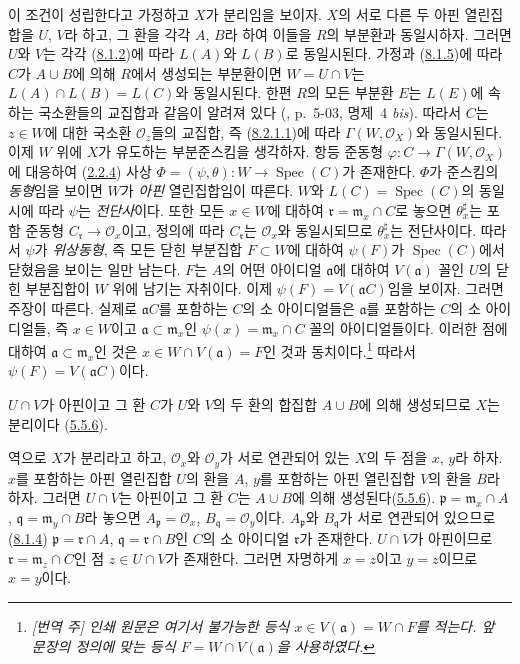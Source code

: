 이 조건이 성립한다고 가정하고 $X$가 분리임을 보이자. $X$의 서로 다른
두 아핀 열린집합을 $U$, $V$라 하고, 그 환을 각각 $A$, $B$라 하여
이들을 $R$의 부분환과 동일시하자. 그러면 $U$와 $V$는 각각
(\hyperref[I.8.1.2-ko]{8.1.2})에 따라 $L(A)$와 $L(B)$로 동일시된다.
가정과 (\hyperref[I.8.1.5-ko]{8.1.5})에 따라 $C$가 $A\cup B$에 의해
$R$에서 생성되는 부분환이면 $W=U\cap V$는
$L(A)\cap L(B)=L(C)$와 동일시된다. 한편 $R$의 모든 부분환 $E$는
$L(E)$에 속하는 국소환들의 교집합과 같음이 알려져 있다
(\cite{I-1}, p.~5-03, 명제~4 \emph{bis}). 따라서 $C$는 $z\in W$에
대한 국소환 $\mathscr{O}_z$들의 교집합, 즉
(\hyperref[I.8.2.1.1-ko]{8.2.1.1})에 따라
$\Gamma(W,\mathscr{O}_X)$와 동일시된다. 이제 $W$ 위에 $X$가 유도하는
부분준스킴을 생각하자. 항등 준동형
$\varphi:C\to\Gamma(W,\mathscr{O}_X)$에 대응하여
(\hyperref[I.2.2.4-ko]{2.2.4}) 사상
$\Phi=(\psi,\theta):W\to\operatorname{Spec}(C)$가 존재한다. $\Phi$가
준스킴의 \emph{동형}임을 보이면 $W$가 \emph{아핀} 열린집합임이
따른다. $W$와 $L(C)=\operatorname{Spec}(C)$의 동일시에 따라
$\psi$는 \emph{전단사}이다. 또한 모든 $x\in W$에 대하여
$\mathfrak r=\mathfrak m_x\cap C$로 놓으면 $\theta_x^\sharp$는 포함
준동형 $C_\mathfrak r\to\mathscr{O}_x$이고, 정의에 따라
$C_\mathfrak r$는 $\mathscr{O}_x$와 동일시되므로
$\theta_x^\sharp$는 전단사이다. 따라서 $\psi$가 \emph{위상동형}, 즉
모든 닫힌 부분집합 $F\subset W$에 대하여 $\psi(F)$가
$\operatorname{Spec}(C)$에서 닫혔음을 보이는 일만 남는다. $F$는
$A$의 어떤 아이디얼 $\mathfrak a$에 대하여 $V(\mathfrak a)$ 꼴인
$U$의 닫힌 부분집합이 $W$ 위에 남기는 자취이다. 이제
$\psi(F)=V(\mathfrak a C)$임을 보이자. 그러면 주장이 따른다. 실제로
$\mathfrak a C$를 포함하는 $C$의 소 아이디얼들은 $\mathfrak a$를
포함하는 $C$의 소 아이디얼들, 즉 $x\in W$이고
$\mathfrak a\subset\mathfrak m_x$인
$\psi(x)=\mathfrak m_x\cap C$ 꼴의 아이디얼들이다. 이러한 점에 대하여
$\mathfrak a\subset\mathfrak m_x$인 것은
$x\in W\cap V(\mathfrak a)=F$인 것과 동치이다.\footnote{\emph{[번역 주]
인쇄 원문은 여기서 불가능한 등식
$x\in V(\mathfrak a)=W\cap F$를 적는다. 앞 문장의 정의에 맞는
등식 $F=W\cap V(\mathfrak a)$을 사용하였다.}} 따라서
$\psi(F)=V(\mathfrak a C)$이다.

$U\cap V$가 아핀이고 그 환 $C$가 $U$와 $V$의 두 환의 합집합
$A\cup B$에 의해 생성되므로 $X$는 분리이다
(\hyperref[I.5.5.6-ko]{5.5.6}).

역으로 $X$가 분리라고 하고, $\mathscr{O}_x$와 $\mathscr{O}_y$가 서로
연관되어 있는 $X$의 두 점을 $x$, $y$라 하자. $x$를 포함하는 아핀
열린집합 $U$의 환을 $A$, $y$를 포함하는 아핀 열린집합 $V$의 환을
$B$라 하자. 그러면 $U\cap V$는 아핀이고 그 환 $C$는 $A\cup B$에
의해 생성된다(\hyperref[I.5.5.6-ko]{5.5.6}).
$\mathfrak p=\mathfrak m_x\cap A$,
$\mathfrak q=\mathfrak m_y\cap B$라 놓으면
$A_\mathfrak p=\mathscr{O}_x$, $B_\mathfrak q=\mathscr{O}_y$이다.
$A_\mathfrak p$와 $B_\mathfrak q$가 서로 연관되어 있으므로
(\hyperref[I.8.1.4-ko]{8.1.4})
$\mathfrak p=\mathfrak r\cap A$,
$\mathfrak q=\mathfrak r\cap B$인 $C$의 소 아이디얼
$\mathfrak r$가 존재한다. $U\cap V$가 아핀이므로
$\mathfrak r=\mathfrak m_z\cap C$인 점 $z\in U\cap V$가 존재한다.
그러면 자명하게 $x=z$이고 $y=z$이므로 $x=y$이다.

